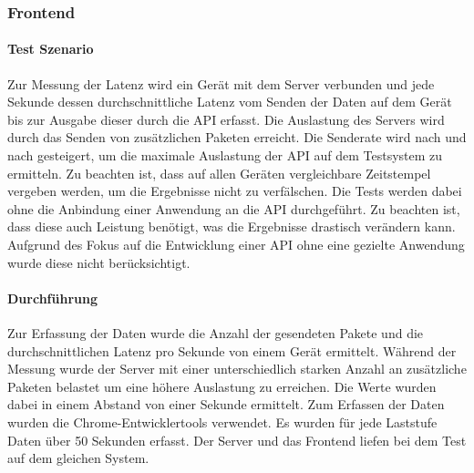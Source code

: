 \documentclass[a4paper]{spie}  %
\begin{document}
\subsubsection{Frontend}

\paragraph{Test Szenario}
Zur Messung der Latenz wird ein Gerät mit dem Server verbunden und jede Sekunde dessen durchschnittliche Latenz vom Senden der Daten auf dem Gerät bis zur Ausgabe dieser durch die API erfasst. Die Auslastung des Servers wird durch das Senden von zusätzlichen Paketen erreicht. Die Senderate wird nach und nach gesteigert, um die maximale Auslastung der API auf dem Testsystem zu ermitteln. Zu beachten ist, dass auf allen Geräten vergleichbare Zeitstempel vergeben werden, um die Ergebnisse nicht zu verfälschen. Die Tests werden dabei ohne die Anbindung einer Anwendung an die API durchgeführt. Zu beachten ist, dass diese auch Leistung benötigt, was die Ergebnisse drastisch verändern kann. Aufgrund des Fokus auf die Entwicklung einer API ohne eine gezielte Anwendung wurde diese nicht berücksichtigt.


\paragraph{Durchführung}
Zur Erfassung der Daten wurde die Anzahl der gesendeten Pakete und die durchschnittlichen Latenz pro Sekunde von einem Gerät ermittelt. Während der Messung wurde der Server mit einer unterschiedlich starken Anzahl an zusätzliche Paketen belastet um eine höhere Auslastung zu erreichen. Die Werte wurden dabei in einem Abstand von einer Sekunde ermittelt. Zum Erfassen der Daten wurden die Chrome-Entwicklertools verwendet. Es wurden für jede Laststufe Daten über 50 Sekunden erfasst. Der Server und das Frontend liefen bei dem Test auf dem gleichen System.
\end{document}

